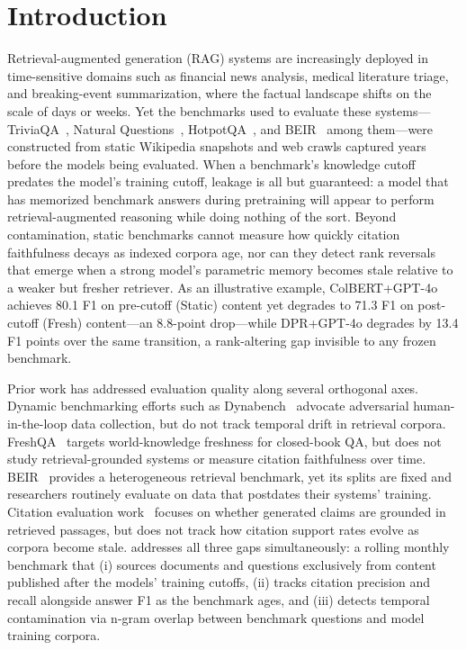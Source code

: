\section{Introduction}
\label{sec:introduction}

Retrieval-augmented generation (RAG) systems are increasingly deployed in time-sensitive domains such as financial news analysis, medical literature triage, and breaking-event summarization, where the factual landscape shifts on the scale of days or weeks. Yet the benchmarks used to evaluate these systems---TriviaQA~\citep{joshi2017triviaqa}, Natural Questions~\citep{kwiatkowski2019nq}, HotpotQA~\citep{yang2018hotpotqa}, and BEIR~\citep{thakur2021beir} among them---were constructed from static Wikipedia snapshots and web crawls captured years before the models being evaluated. When a benchmark's knowledge cutoff predates the model's training cutoff, leakage is all but guaranteed: a model that has memorized benchmark answers during pretraining will appear to perform retrieval-augmented reasoning while doing nothing of the sort. Beyond contamination, static benchmarks cannot measure how quickly citation faithfulness decays as indexed corpora age, nor can they detect rank reversals that emerge when a strong model's parametric memory becomes stale relative to a weaker but fresher retriever. As an illustrative example, ColBERT+GPT-4o achieves 80.1 F1 on pre-cutoff (Static) content yet degrades to 71.3 F1 on post-cutoff (Fresh) content---an 8.8-point drop---while DPR+GPT-4o degrades by 13.4 F1 points over the same transition, a rank-altering gap invisible to any frozen benchmark.

Prior work has addressed evaluation quality along several orthogonal axes. Dynamic benchmarking efforts such as Dynabench~\citep{dynabench2021} advocate adversarial human-in-the-loop data collection, but do not track temporal drift in retrieval corpora. FreshQA~\citep{vu2023freshqa} targets world-knowledge freshness for closed-book QA, but does not study retrieval-grounded systems or measure citation faithfulness over time. BEIR~\citep{thakur2021beir} provides a heterogeneous retrieval benchmark, yet its splits are fixed and researchers routinely evaluate on data that postdates their systems' training. Citation evaluation work~\citep{gao2023enabling,min2023factscore} focuses on whether generated claims are grounded in retrieved passages, but does not track how citation support rates evolve as corpora become stale. \method{} addresses all three gaps simultaneously: a rolling monthly benchmark that (i) sources documents and questions exclusively from content published after the models' training cutoffs, (ii) tracks citation precision and recall alongside answer F1 as the benchmark ages, and (iii) detects temporal contamination via n-gram overlap between benchmark questions and model training corpora.

